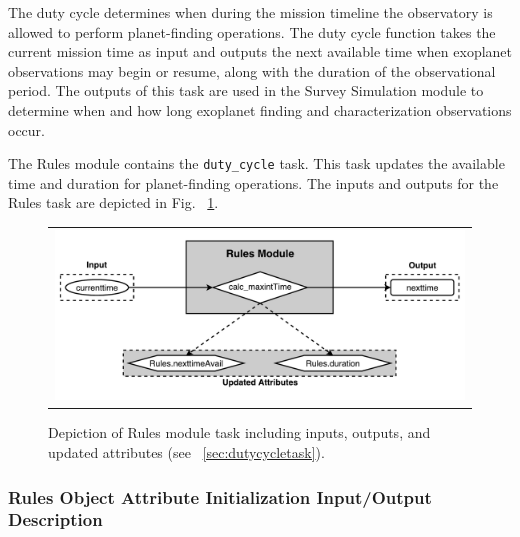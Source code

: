 \documentclass[cleanfoot]{asme2ej}
\begin{document}
The duty cycle determines when during the mission timeline the observatory is allowed to perform planet-finding operations.  The duty cycle function takes the current mission time as input and outputs the next available time when exoplanet observations may begin or resume, along with the duration of the observational period. The outputs of this task are used in the Survey Simulation module to determine when and how long exoplanet finding and characterization observations occur.  

The Rules module contains the \verb+duty_cycle+ task.  This task updates the available time and duration for planet-finding operations.  The inputs and outputs for the Rules task are depicted in Fig. ~\ref{fig:rulesmodule}.

\begin{figure}[ht]
    \begin{center}
        \begin{tabular}{c}
             \includegraphics[width=\textwidth]{RulesTasks}
        \end{tabular}
    \end{center}
    \caption{\label{fig:rulesmodule} Depiction of Rules module task including inputs, outputs, and updated attributes (see ~\ref{sec:dutycycletask}).}
\end{figure}

\subsubsection{Rules Object Attribute Initialization Input/Output Description}
\end{document}
